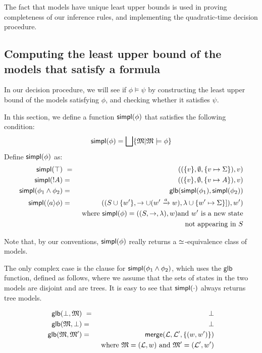 The fact that \cathoristic{} models have unique least upper bounds is used in proving
completeness of our inference rules, and implementing the quadratic-time
decision procedure.

\subsection{Computing the least upper bound of the models that satisfy a formula}
\label{simpl}

In our decision procedure, we will see if $\phi \models \psi$ by constructing the least upper bound of the models satisfying $\phi$, and checking whether it satisfies $\psi$.

In this section, we define a function $\mathsf{simpl}(\phi)$ that satisfies the following condition:
\[
\mathsf{simpl}(\phi) = \bigsqcup \{ \frak{M} | \frak{M} \models \phi \}
\]
Define $\mathsf{simpl}(\phi)$ as:
\begin{eqnarray*}
  \mathsf{simpl}(\top) &\ = \ & ( (\{v\}, \emptyset, \{v \mapsto \Sigma\}), v)  \\
  \mathsf{simpl}(! A) & = & ( (\{v\}, \emptyset, \{v \mapsto A\}), v)  \\
  \mathsf{simpl}(\phi_1 \land \phi_2) & = & \mathsf{glb} (\mathsf{simpl}(\phi_1), \mathsf{simpl}(\phi_2))  \\
  \mathsf{simpl}(\langle a \rangle \phi) 
     & = & ( (S \cup \{w'\}, \rightarrow \cup (w' \xrightarrow{a} w), \lambda \cup \{w' \mapsto \Sigma\}]), w')  \\
		& & \mbox{where }\mathsf{simpl}(\phi) = ( (S, \rightarrow, \lambda), w) \mbox{and } w' \mbox{ is a new state} \\
                &&  \mbox{not appearing in }S 
\end{eqnarray*}



\NI Note that, by our conventions, $\mathsf{simpl}(\phi)$ really returns a
$\simeq$-equivalence class of models.

The only complex case is the clause for $\mathsf{simpl}(\phi_1 \land \phi_2)$,
which uses the $\mathsf{glb}$ function, defined as follows, where we assume
that the sets of states in the two models are disjoint and are trees.
It is easy to see that $\mathsf{simpl}(\cdot)$ always returns tree models.

\begin{eqnarray*}
  \mathsf{glb}(\bot, \frak{M})  &\ =\ &  \bot  \\
  \mathsf{glb}(\frak{M}, \bot)      & = &  \bot  
     \\
  \mathsf{glb}(\frak{M}, \frak{M}')
     & = & 
     \mathsf{merge}(\mathcal{L}, \mathcal{L}', \{(w,w')\}) 
     \\
     & & \text{where } \frak{M} = (\mathcal{L}, w) \text{ and } \frak{M}' = (\mathcal{L'}, w')
\end{eqnarray*}

